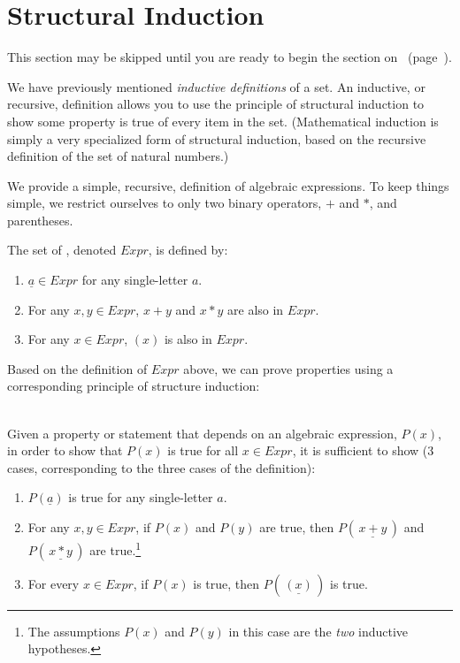 \section{Structural Induction}

\begin{discussion}
This section may be skipped until you are ready to begin the section on~ (page~\pageref{sec:regexp}).
\end{discussion}


We have previously mentioned \emph{inductive definitions} of a set. An inductive, or recursive, definition allows you to use the principle of structural induction to show some property is true of every item in the set. (Mathematical induction is simply a very specialized form of structural induction, based on the recursive definition of the set of natural numbers.)

\begin{defn}
We provide a simple, recursive, definition of algebraic expressions. To keep things simple, we restrict ourselves to only two binary operators, $+$ and $*$, and parentheses. 

The set of , denoted $Expr$, is defined by:
\begin{enumerate}
\item $\underline{a} \in Expr$ for any single-letter $a$.
\item For any $x, y \in Expr$, \underline{$x + y$} and \underline{$x * y$} are also in $Expr$.
\item For any $x \in Expr$, \underline{$(x)$} is also in $Expr$.
\end{enumerate}
\end{defn}

\begin{discussion}
Based on the definition of $Expr$ above, we can prove properties using a corresponding principle of structure induction:
\\~
\end{discussion}

\begin{axiom}
Given a property or statement that depends on an algebraic expression, $P(x)$, in order to show that $P(x)$ is true for all $x \in Expr$, it is sufficient to show (3 cases, corresponding to the three cases of the definition):

\begin{enumerate}
\item $P(\underline{a})$ is true for any single-letter $a$.
\item For any $x, y \in Expr$, if $P(x)$ and $P(y)$ are true, then $P(\,\underline{x + y}\,)$ and $P(\,\underline{x * y}\,)$ are true.\footnote{The assumptions $P(x)$ and $P(y)$ in this case are the \emph{two} inductive hypotheses.}
\item For every $x \in Expr$, if $P(x)$ is true, then $P(\,\underline{(x)}\,)$ is true.
\end{enumerate}

\end{axiom}

